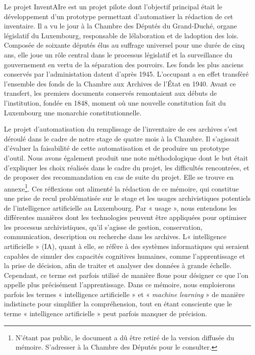 	Le projet InventAIre est un projet pilote dont l'objectif principal
	était le développement d'un prototype permettant d'automatiser la
	rédaction de cet inventaire. Il a vu le jour à la Chambre des Députés du
	Grand-Duché, organe législatif du Luxembourg, responsable de
	l\textquotesingle élaboration et de l\textquotesingle adoption des lois.
	Composée de soixante députés élus au suffrage universel pour une durée de cinq
	ans, elle joue un rôle central dans le processus législatif et la
	surveillance du gouvernement en vertu de la séparation des pouvoirs. 
	Les fonds les plus anciens conservés par l'administation datent d'après 1945.
	L'occupant a en effet transféré l'ensemble des fonds de la Chambre aux Archives de 
	l'État en 1940. Avant ce transfert, les premiers documents conservés remontaient aux débuts de l'institution, 
	fondée en 1848, moment où une nouvelle constitution fait du Luxembourg 
	une monarchie constitutionnelle.
	\newline	
	
	Le
	projet d'automatisation du remplissage de l'inventaire de ces archives
	s'est déroulé dans le cadre de notre stage de quatre mois à la Chambre.
	Il s'agissait d'évaluer la faisabilité de cette automatisation et de
	produire un prototype d'outil.
	Nous avons également produit une note méthodologique dont le but était
	d'expliquer les choix réalisés dans le cadre du projet, les difficultés
	rencontrées, et de proposer des recommandation en cas de suite du
	projet. Elle se trouve en annexe\footnote{N’étant pas public, le document a dû être retiré de la version diffusée du mémoire. S’adresser à la Chambre des Députés pour le consulter.}. Ces réflexions ont alimenté
	la rédaction de ce mémoire, qui constitue une prise de recul
	problématisée sur le stage et les usages archivistiques potentiels de
	l'intelligence artificielle au Luxembourg. Par « usage », nous entendons
	les différentes manières dont les technologies peuvent être appliquées
	pour optimiser les processus archivistiques, qu'il s'agisse de gestion,
	conservation, communication, description ou recherche dans les archives.
	L\textquotesingle« intelligence artificielle » (IA), quant à elle, se
	réfère à des systèmes informatiques qui seraient capables de simuler des
	capacités cognitives humaines, comme l'apprentissage et la prise de
	décision, afin de traiter et analyser des données à grande échelle.
	Cependant, ce terme est parfois utilisé de manière floue pour désigner
	ce que l'on appelle plus précisément l'\gls{apprentissage}. Dans ce mémoire, nous emploierons parfois les
	termes « intelligence artificielle » et « \emph{machine learning} » de manière
	indistincte pour simplifier la compréhension, tout en étant consciente
	que le terme « intelligence artificielle » peut parfois manquer de
	précision. 
	
